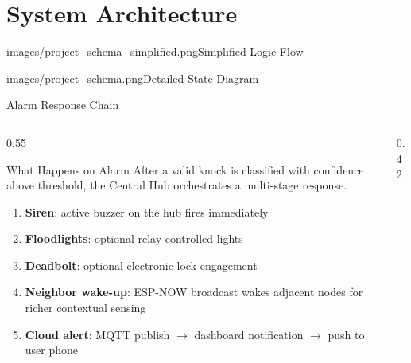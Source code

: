 \section{System Architecture}

\begin{titlepic}{images/project_schema_simplified.png}{Simplified Logic Flow}
\end{titlepic}

\begin{titlepic}[0.85]{images/project_schema.png}{Detailed State Diagram}
\end{titlepic}

\begin{frame}{Alarm Response Chain}
\begin{columns}[T,onlytextwidth]
\begin{column}{0.55\textwidth}
\begin{block}{What Happens on Alarm}
After a valid knock is classified with confidence above threshold, the Central Hub orchestrates a multi-stage response.
\end{block}
\vspace{0.2cm}
\begin{enumerate}
\item \textbf{Siren}: active buzzer on the hub fires immediately
\item \textbf{Floodlights}: optional relay-controlled lights
\item \textbf{Deadbolt}: optional electronic lock engagement
\item \textbf{Neighbor wake-up}: ESP-NOW broadcast wakes adjacent nodes for richer contextual sensing
\item \textbf{Cloud alert}: MQTT publish $\rightarrow$ dashboard notification $\rightarrow$ push to user phone
\end{enumerate}
\end{column}
\begin{column}{0.42\textwidth}
\centering
{}
\end{column}
\end{columns}
\end{frame}
